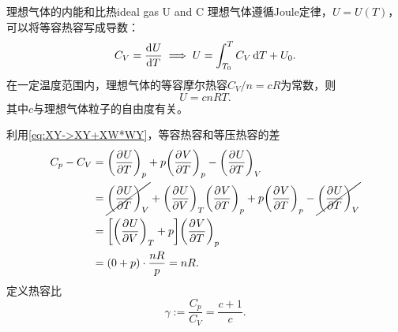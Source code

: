\begin{example}
	{理想气体的内能和比热}{ideal gas U and C}
	理想气体遵循Joule定律，$U=U(T)$，可以将等容热容写成导数：
	\begin{equation}
		\label{eq:C_V->U}
		C_V=\dv UT\implies U=\int_{T_0}^TC_V\d T+U_0.
	\end{equation}
	在一定温度范围内，理想气体的等容摩尔热容$C_V/n=cR$为常数，则
	\begin{equation}
		U=cnRT.
	\end{equation}
	其中$c$与理想气体粒子的自由度有关。

	利用\eqref{eq:XY->XY+XW*WY}，等容热容和等压热容的差
	\begin{align}
		\notag
		C_p-C_V&=\pu[p]UT+p\pu[p]VT-\pu[V]UT\\
		\notag
		&=\cancel{\pu[V]UT}+\pu[T]UV\pu[p]VT+p\pu[p]VT-\cancel{\pu[V]UT}\\
		&=\biggfkh{\pu[T]UV+p}\pu[p]VT\\
		&=(0+p)\cdot\frac{nR}p=nR.
	\end{align}
	定义热容比
	\begin{equation}
		\gamma:=\frac{C_p}{C_V}=\frac{c+1}{c}.
	\end{equation}
\end{example}

